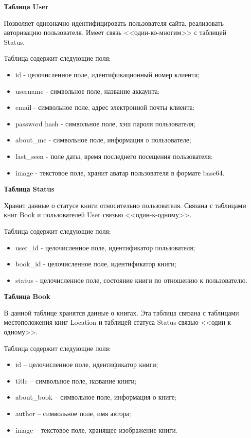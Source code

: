 \documentclass[12pt]{article}
\begin{document}
\hfill \break

{\bf Таблица User}

Позволяет однозначно идентифицировать пользователя сайта, реализовать авторизацию пользователя. Имеет связь <<один-ко-многим>> с таблицей Status. 


Таблица содержит следующие поля:
\begin{itemize}
	\item id - целочисленное поле, идентификационный номер клиента;
	\item username - символьное поле, название аккаунта;
	\item email - символьное поле, адрес электронной почты клиента;
	\item password hash - символьное поле, хэш пароля пользователя;
	\item about\_me - символьное поле, информация о пользователе;
	\item last\_seen - поле даты, время последнего посещения пользователя;
	\item image - текстовое поле, хранит аватар пользователя в формате base64.
\end{itemize}

\hfill \break

{\bf Таблица Status}

Хранит данные о статусе книги относительно пользователя. Связана с таблицами книг Book и пользователей User связью <<один-к-одному>>.

Таблица содержит следующие поля:
\begin{itemize}
	\item user\_id - целочисленное поле, идентификатор пользователя;
	\item book\_id - целочисленное поле, идентификатор книги;
	\item status - целочисленное поле, состояние книги по отношению к пользователю.
\end{itemize}

\hfill \break

{\bf Таблица Book}

В данной таблице хранятся данные о книгах. Эта таблица связана с таблицами местоположения книг Location и таблицей статуса Status связью <<один-к-одному>>.

Таблица содержит следующие поля:
\begin{itemize}
	\item id – целочисленное поле, идентификатор книги;
	\item title – символьное поле, название книги;
	\item about\_book – символьное поле, информация о книге;
	\item author – символьное поле, имя автора;
	\item image – текстовое поле, хранящее изображение книги.
\end{itemize}
\end{document}
